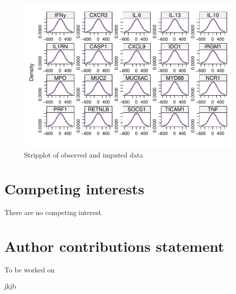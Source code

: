 \documentclass[webpdf,large,contemporary,namedate]{oup-authoring-template}
\theoremstyle{thmstyleone}
\theoremstyle{thmstyletwo}
\theoremstyle{thmstylethree}
\begin{document}
\begin{figure}[th]
\includegraphics[width=1\linewidth]{x_files/figure-latex/sup_fig3-1} \caption{Stripplot of observed and imputed data}\label{fig:sup_fig3}
\end{figure}

\section{Competing interests}

There are no competing interest.

\section{Author contributions statement}

To be worked on






\begin{biography}{%
%
}{\author{Fay Webster} jkjb}
\end{biography}
\end{document}
